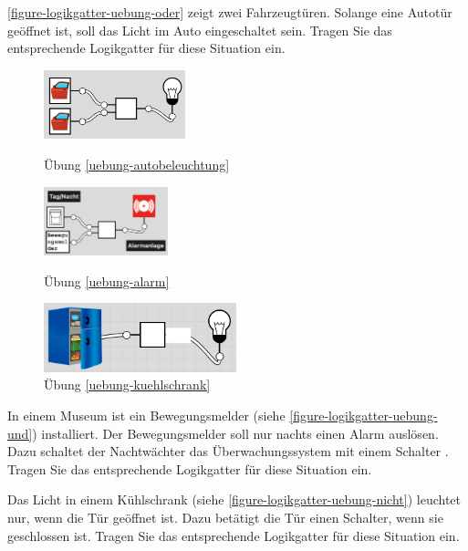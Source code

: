 \begin{exercise}\label{uebung-autobeleuchtung}
\autoref{figure-logikgatter-uebung-oder} zeigt zwei Fahrzeugtüren. Solange eine Autotür geöffnet ist, soll das Licht im Auto eingeschaltet sein. Tragen Sie das entsprechende Logikgatter für diese Situation ein.

\begin{figure}[htb]
\centering
\begin{minipage}{0.275\textwidth}
\centering
\includegraphics[height=2cm]{logikgatter_uebung_oder}
\caption{Übung \ref{uebung-autobeleuchtung}}
\label{figure-logikgatter-uebung-oder}
\end{minipage}
\hfill
\begin{minipage}{0.275\textwidth}
\centering
\includegraphics[height=2cm]{logikgatter_uebung_und}
\caption{Übung \ref{uebung-alarm}}
\label{figure-logikgatter-uebung-und}
\centering
\end{minipage}
\hfill
\begin{minipage}{0.35\textwidth}
\centering
\includegraphics[height=2cm]{logikgatter_uebung_nicht}
\caption{Übung \ref{uebung-kuehlschrank}}
\label{figure-logikgatter-uebung-nicht}
\centering
\end{minipage}
\end{figure}
\end{exercise}

\begin{exercise}\label{uebung-alarm}
In einem Museum ist ein Bewegungsmelder (siehe \autoref{figure-logikgatter-uebung-und}) installiert. Der Bewegungsmelder soll nur nachts einen Alarm auslösen. Dazu schaltet der Nachtwächter das Überwachungssystem mit einem Schalter . Tragen Sie das entsprechende Logikgatter für diese Situation ein.
\end{exercise}

\begin{exercise}\label{uebung-kuehlschrank}
Das Licht in einem Kühlschrank (siehe \autoref{figure-logikgatter-uebung-nicht}) leuchtet nur, wenn die Tür geöffnet ist. Dazu betätigt die Tür einen Schalter, wenn sie geschlossen ist. Tragen Sie das entsprechende Logikgatter für diese Situation ein.
\end{exercise}
